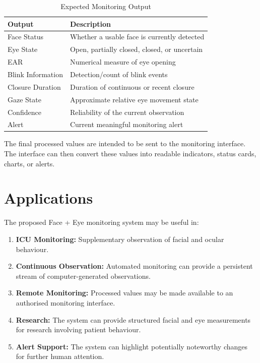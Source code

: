 \documentclass[12pt]{tietreport}
\begin{document}
\begin{table}[H]
\centering
\caption{Expected Monitoring Output}
\begin{tabular}{p{}p{}}
\toprule
\textbf{Output} & \textbf{Description} \\
\midrule
Face Status & Whether a usable face is currently detected \\
Eye State & Open, partially closed, closed, or uncertain \\
EAR & Numerical measure of eye opening \\
Blink Information & Detection/count of blink events \\
Closure Duration & Duration of continuous or recent closure \\
Gaze State & Approximate relative eye movement state \\
Confidence & Reliability of the current observation \\
Alert & Current meaningful monitoring alert \\
\bottomrule
\end{tabular}
\end{table}

The final processed values are intended to be sent to the monitoring
interface. The interface can then convert these values into
readable indicators, status cards, charts, or alerts.


\chapter{Applications}

The proposed Face + Eye monitoring system may be useful in:

\begin{enumerate}[leftmargin=*]

    \item \textbf{ICU Monitoring:}
    Supplementary observation of facial and ocular behaviour.

    \item \textbf{Continuous Observation:}
    Automated monitoring can provide a persistent stream of
    computer-generated observations.

    \item \textbf{Remote Monitoring:}
    Processed values may be made available to an authorised
    monitoring interface.

    \item \textbf{Research:}
    The system can provide structured facial and eye measurements
    for research involving patient behaviour.

    \item \textbf{Alert Support:}
    The system can highlight potentially noteworthy changes for
    further human attention.

\end{enumerate}
\end{document}
